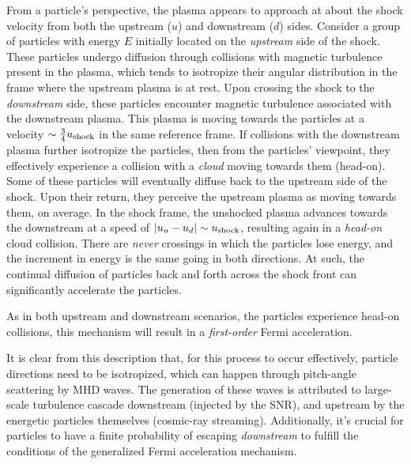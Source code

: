 From a particle's perspective, the plasma appears to approach at about the shock velocity from both the upstream (\( u \)) and downstream (\( d \)) sides. 
%
Consider a group of particles with energy \( E \) initially located on the \emph{upstream} side of the shock. These particles undergo diffusion through collisions with magnetic turbulence present in the plasma, which tends to isotropize their angular distribution in the frame where the upstream plasma is at rest.
%
Upon crossing the shock to the \emph{downstream} side, these particles encounter magnetic turbulence associated with the downstream plasma. This plasma is moving towards the particles at a velocity \( \sim \frac{3}{4} u_{\rm shock} \) in the same reference frame. If collisions with the downstream plasma further isotropize the particles, then from the particles' viewpoint, they effectively experience a collision with a \emph{cloud} moving towards them (head-on). 
%
Some of these particles will eventually diffuse back to the upstream side of the shock. Upon their return, they perceive the upstream plasma as moving towards them, on average. In the shock frame, the unshocked plasma advances towards the downstream at a speed of \( |u_u - u_d| \sim u_{\rm shock} \), resulting again in a \emph{head-on} cloud collision.
%
There are \emph{never} crossings in which the particles lose energy, and the increment in energy is the same going in both directions. At such, the continual diffusion of particles back and forth across the shock front can significantly accelerate the particles. 

As in both upstream and downstream scenarios, the particles experience head-on collisions, this mechanism will result in a \emph{first-order} Fermi acceleration.


It is clear from this description that, for this process to occur effectively, particle directions need to be isotropized, which can happen through pitch-angle scattering by MHD waves. The generation of these waves is attributed to large-scale turbulence cascade downstream (injected by the SNR), and upstream by the energetic particles themselves (cosmic-ray streaming).
%
Additionally, it's crucial for particles to have a finite probability of escaping \emph{downstream} to fulfill the conditions of the generalized Fermi acceleration mechanism.

